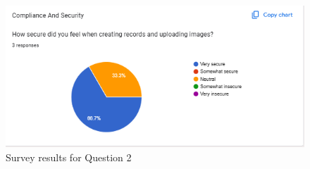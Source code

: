\documentclass[12pt, titlepage]{article}
\begin{document}
  \begin{figure}[ht!]
    \centering
    \includegraphics[scale=1.3]{../assets/s2.png}
    \caption{Survey results for Question 2}
    \label{fig:survey2}
  \end{figure}
  
\end{document}
